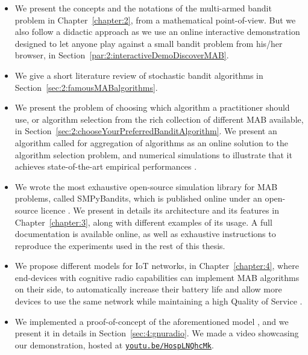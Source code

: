 \begin{itemize}
    \item
    We present the concepts and the notations of the multi-armed bandit problem in Chapter~\ref{chapter:2}, from a mathematical point-of-view.
    But we also follow a didactic approach as we use an online interactive demonstration designed to let anyone play against a small bandit problem from his/her browser, in Section~\ref{par:2:interactiveDemoDiscoverMAB}.

    \item
    We give a short literature review of stochastic bandit algorithms in Section~\ref{sec:2:famousMABalgorithms}.

    \item
    We present the problem of choosing which algorithm a practitioner should use, or algorithm selection from the rich collection of different MAB available, in Section~\ref{sec:2:chooseYourPreferredBanditAlgorithm}.
    We present an algorithm called \Aggr{} for aggregation of algorithms as an online solution to the algorithm selection problem, and numerical simulations to illustrate that it achieves state-of-the-art empirical performances
    \cite{Besson2018WCNC}.

    \item
    We wrote the most exhaustive open-source simulation library for MAB problems, called SMPyBandits, which is published online under an open-source licence \cite{SMPyBandits,SMPyBanditsJMLR}.
    We present in details its architecture and its features in Chapter~\ref{chapter:3}, along with different examples of its usage.
    A full documentation is available online, as well as exhaustive instructions to reproduce the experiments used in the rest of this thesis.

    \item
    We propose different models for IoT networks, in Chapter~\ref{chapter:4}, where end-devices with cognitive radio capabilities can implement MAB algorithms on their side, to automatically increase their battery life and allow more devices to use the same network while maintaining a high Quality of Service
    \cite{Bonnefoi17,Besson2019WCNC,Bonnefoi2019WCNC}.

    \item
    We implemented a proof-of-concept of the aforementioned model \cite{Besson2018ICT}, and we present it in details in Section~\ref{sec:4:gnuradio}. We made a video showcasing our demonstration, hosted at \texttt{\href{https://youtu.be/HospLNQhcMk}{youtu.be/HospLNQhcMk}}.


\end{itemize}
